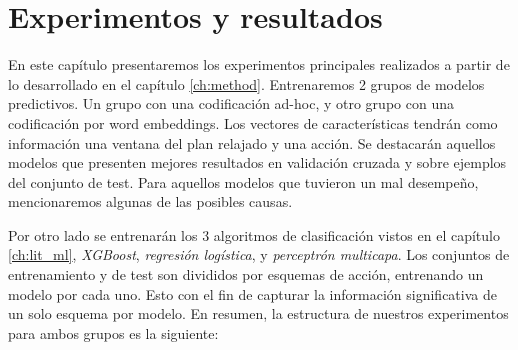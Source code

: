\chapter{Experimentos y resultados}
\label{ch:results}

En este capítulo presentaremos los experimentos principales realizados a partir de lo desarrollado en el capítulo \ref{ch:method}. Entrenaremos 2 grupos de modelos predictivos. Un grupo con una codificación ad-hoc, y otro grupo con una codificación por word embeddings. Los vectores de características tendrán como información una ventana del plan relajado y una acción. Se destacarán aquellos modelos que presenten mejores resultados en validación cruzada y sobre ejemplos del conjunto de test. Para aquellos modelos que tuvieron un mal desempeño, mencionaremos algunas de las posibles causas.

Por otro lado se entrenarán los 3 algoritmos de clasificación vistos en el capítulo \ref{ch:lit_ml}, \emph{XGBoost}, \emph{regresión logística}, y \emph{perceptrón multicapa}. Los conjuntos de entrenamiento y de test son divididos por esquemas de acción, entrenando un modelo por cada uno. Esto con el fin de capturar la información significativa de un solo esquema por modelo. En resumen, la estructura de nuestros experimentos para ambos grupos es la siguiente:

